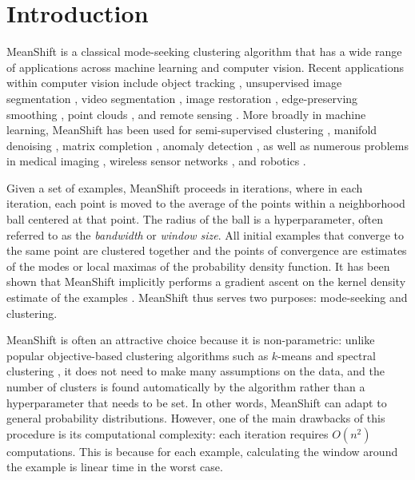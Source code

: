 \section{Introduction}

MeanShift \cite{cheng1995mean,comaniciu1999mean,fukunaga1975estimation} is a classical mode-seeking clustering algorithm that has a wide range of applications across machine learning and computer vision. Recent applications within computer vision include object tracking \cite{ning2012robust,vojir2014robust,leichter2010mean}, unsupervised image segmentation \cite{tao2007color,carreira2006acceleration,zhou2013mean}, video segmentation \cite{paris2007topological,dementhon2002spatio,paris2008edge}, image restoration \cite{arjomand2017deep,bigdeli2017image}, edge-preserving smoothing \cite{paris2008edge,barash2004common,buschenfeld2012edge}, point clouds \cite{lee2009shoreline,vosselman2013point,yue2018new}, and remote sensing \cite{ming2012semivariogram,ponti2012segmentation,chen2018airborne,michel2014stable}. More broadly in machine learning, MeanShift has been used for semi-supervised clustering \cite{anand2013semi,tuzel2009kernel}, manifold denoising \cite{xiang2016statistical,wang2010manifold}, matrix completion \cite{wang2011denoising,choudhary2016active}, anomaly detection \cite{aydin2013robust,yu2013scalable,tsai2010mean}, as well as numerous problems in medical imaging \cite{bai2013novel,tek2001vessel,zhou2011gradient,mayer2009adaptive,tek2010method,nguyen2012clustering,zhou2009anisotropic,zhou2014semi}, wireless sensor networks \cite{yu2020mean,zhou2009mean,xie2014k,sapre2018moth,wu2011video,qu2018incorporating}, and robotics \cite{kroemer2009active,lakaemper2009simultaneous,hu2013design,kato2005optimizing,yang2014robotic,cha2011mahru}.

Given a set of examples, MeanShift proceeds in iterations, where in each iteration, each point is moved to the average of the points within a neighborhood ball centered at that point. The radius of the ball is a hyperparameter, often referred to as the {\it bandwidth} or {\it window size}. All initial examples that converge to the same point are clustered together and the points of convergence are estimates of the modes or local maximas of the probability density function. It has been shown that MeanShift implicitly performs a gradient ascent on the kernel density estimate of the examples \cite{arias2016estimation}. MeanShift thus serves two purposes: mode-seeking and clustering.

MeanShift is often an attractive choice because it is non-parametric: unlike popular objective-based clustering algorithms such as $k$-means \cite{arthur2006k,kanungo2002efficient} and spectral clustering \cite{ng2002spectral,von2007tutorial}, it does not need to make many assumptions on the data, and the number of clusters is found automatically by the algorithm rather than a hyperparameter that needs to be set. In other words, MeanShift can adapt to general probability distributions. However, one of the main drawbacks of this procedure is its computational complexity: each iteration requires $O(n^2)$ computations. This is because for each example, calculating the window around the example is linear time in the worst case.

